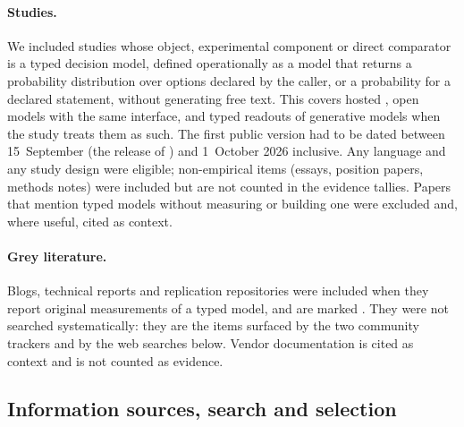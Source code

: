 \paragraph{Studies.}
We included studies whose object, experimental component or direct comparator is a typed decision model, defined operationally as a model that returns a probability distribution over options declared by the caller, or a probability for a declared statement, without generating free text.
This covers hosted \jev{}, open models with the same interface, and typed readouts of generative models when the study treats them as such.
The first public version had to be dated between 15~September (the release of \jev{}) and 1~October 2026 inclusive.
Any language and any study design were eligible; non-empirical items (essays, position papers, methods notes) were included but are not counted in the evidence tallies.
Papers that mention typed models without measuring or building one were excluded and, where useful, cited as context.

\paragraph{Grey literature.}
Blogs, technical reports and replication repositories were included when they report original measurements of a typed model, and are marked \gmark{}.
They were not searched systematically: they are the items surfaced by the two community trackers and by the web searches below.
Vendor documentation is cited as context and is not counted as evidence.

\subsection{Information sources, search and selection}
\label{sec:search}

